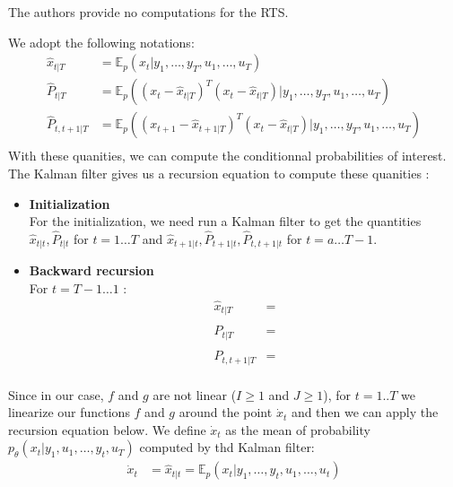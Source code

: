 The authors provide no computations for the RTS.

We adopt the following notations:
\begin{align*}
  \hat{x}_{t|T} &= \mathbb{E}_p(x_t|y_1, \ldots , y_T, u_1, \ldots , u_T) \\
  \hat{P}_{t|T} &= \mathbb{E}_p \left ((x_t - \hat{x}_{t|T})^T(x_t - \hat{x}_{t|T})|y_1, \ldots , y_T, u_1, \ldots , u_T \right ) \\
  \hat{P}_{t,t+1|T} &= \mathbb{E}_p \left ((x_{t+1} - \hat{x}_{t+1|T})^T(x_t - \hat{x}_{t|T})|y_1, \ldots , y_T, u_1, \ldots , u_T \right ) \\
\end{align*}
With these quanities, we can compute the conditionnal probabilities of interest.
The Kalman filter gives us a recursion equation to compute these quanities :
\begin{itemize}
  \item \textbf{Initialization}\\
    For the initialization, we need run a Kalman filter to get the quantities $\hat{x}_{t|t}, \hat{P}_{t|t}$ for $t=1 \ldots T$ and $\hat{x}_{t+1|t}, \hat{P}_{t+1|t}, \hat{P}_{t,t+1|t}$ for $t=a \ldots T-1$.
  \item \textbf{Backward recursion}\\
    For $t=T-1 \ldots 1$ :
    \begin{align*}
      \hat{x}_{t|T} &= \\
      \hat{P}_{t|T} &= \\
      \hat{P}_{t,t+1|T} &= \\
    \end{align*}
\end{itemize}

Since in our case, $f$ and $g$ are not linear ($I \geq 1$ and $J \geq 1$), for $t=1..T$ we linearize our functions $f$ and $g$ around the point $\dot{x}_t$ and then we can apply the recursion equation below.
We define $\dot{x}_t$ as the mean of probability  $p_{\theta}\left(x_t|y_1, u_1, \ldots, y_t, u_T \right )$ computed by thd Kalman filter:
\begin{align*}
  \dot{x}_t &= \hat{x}_{t|t} = \mathbb{E}_p(x_t|y_1, \ldots , y_t, u_1, \ldots , u_t) \\
\end{align*}

